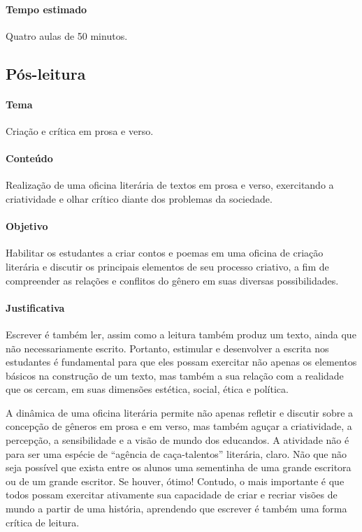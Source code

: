 \documentclass[12pt]{extarticle}
\begin{document}
\paragraph{Tempo estimado} Quatro aulas de 50 minutos.

\subsection{Pós-leitura}

\paragraph{Tema} Criação e crítica em prosa e verso.


\paragraph{Conteúdo} Realização de uma oficina literária de textos em
prosa e verso, exercitando a criatividade e olhar crítico diante dos
problemas da sociedade.

\paragraph{Objetivo} Habilitar os estudantes a criar contos e poemas em
uma oficina de criação literária e discutir os principais elementos de
seu processo criativo, a fim de compreender as relações e conflitos do
gênero em suas diversas possibilidades.

\paragraph{Justificativa} Escrever é também ler, assim como a leitura
também produz um texto, ainda que não necessariamente escrito. Portanto,
estimular e desenvolver a escrita nos estudantes é fundamental para que
eles possam exercitar não apenas os elementos básicos na construção de
um texto, mas também a sua relação com a realidade que os cercam, em
suas dimensões estética, social, ética e política.

A dinâmica de uma oficina literária permite não apenas refletir e
discutir sobre a concepção de gêneros em prosa e em verso, mas também
aguçar a criatividade, a percepção, a sensibilidade e a visão de mundo
dos educandos. A atividade não é para ser uma espécie de ``agência de
caça-talentos'' literária, claro. Não que não seja possível que exista
entre os alunos uma sementinha de uma grande escritora ou de um grande
escritor. Se houver, ótimo! Contudo, o mais importante é que todos
possam exercitar ativamente sua capacidade de criar e recriar visões de
mundo a partir de uma história, aprendendo que escrever é também uma
forma crítica de leitura.
\end{document}
